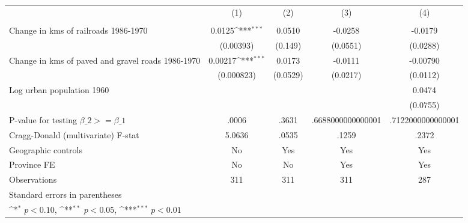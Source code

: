 {
\def\sym#1{\ifmmode^{#1}\else\(^{#1}\)\fi}
\begin{tabular}{l*{4}{c}}
\hline\hline
                &\multicolumn{1}{c}{(1)}&\multicolumn{1}{c}{(2)}&\multicolumn{1}{c}{(3)}&\multicolumn{1}{c}{(4)}\\
                &\multicolumn{1}{c}{}&\multicolumn{1}{c}{}&\multicolumn{1}{c}{}&\multicolumn{1}{c}{}\\
\hline
Change in kms of railroads 1986-1970&   0.0125\sym{***}&   0.0510         &  -0.0258         &  -0.0179         \\
                &(0.00393)         &  (0.149)         & (0.0551)         & (0.0288)         \\
[1em]
Change in kms of paved and gravel roads 1986-1970&  0.00217\sym{***}&   0.0173         &  -0.0111         & -0.00790         \\
                &(0.000823)         & (0.0529)         & (0.0217)         & (0.0112)         \\
[1em]
Log urban population 1960&                  &                  &                  &   0.0474         \\
                &                  &                  &                  & (0.0755)         \\
\hline
P-value for testing $\beta\_{2} >= \beta\_{1}$&    .0006         &    .3631         &.6688000000000001         &.7122000000000001         \\
Cragg-Donald (multivariate) F-stat&   5.0636         &    .0535         &    .1259         &    .2372         \\
Geographic controls&       No         &      Yes         &      Yes         &      Yes         \\
Province FE     &       No         &       No         &      Yes         &      Yes         \\
Observations    &      311         &      311         &      311         &      287         \\
\hline\hline
\multicolumn{5}{l}{\footnotesize Standard errors in parentheses}\\
\multicolumn{5}{l}{\footnotesize \sym{*} \(p<0.10\), \sym{**} \(p<0.05\), \sym{***} \(p<0.01\)}\\
\end{tabular}
}
